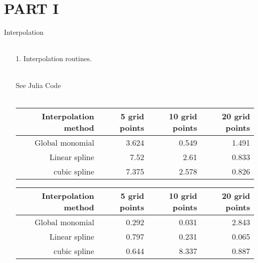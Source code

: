 \documentclass[a4paper]{article}
\begin{document}



\section{PART I}

Interpolation\\~\

\begin{enumerate}
\item[1.] Interpolation routines.\\~\

See Julia Code\\~\

\begin{table}[!htbp]
\centering
\begin{adjustbox}{max width=\textwidth}
\begin{tabular}{rrrr}
\hline\hline
\textbf{Interpolation method} & \textbf{5 grid points} & \textbf{10 grid points} & \textbf{20 grid points} \\\hline
Global monomial & 3.624 & 0.549 & 1.491 \\
Linear spline & 7.52 & 2.61 & 0.833 \\
cubic spline & 7.375 & 2.578 & 0.826 \\\hline\hline
\end{tabular}
\end{adjustbox}
\end{table}

\begin{table}[!htbp]
\centering
\begin{adjustbox}{max width=\textwidth}
\begin{tabular}{rrrr}
\hline\hline
\textbf{Interpolation method} & \textbf{5 grid points} & \textbf{10 grid points} & \textbf{20 grid points} \\\hline
Global monomial & 0.292 & 0.031 & 2.843 \\
Linear spline & 0.797 & 0.231 & 0.065 \\
cubic spline & 0.644 & 8.337 & 0.887 \\\hline\hline
\end{tabular}
\end{adjustbox}
\end{table}


\end{enumerate}
\end{document}
